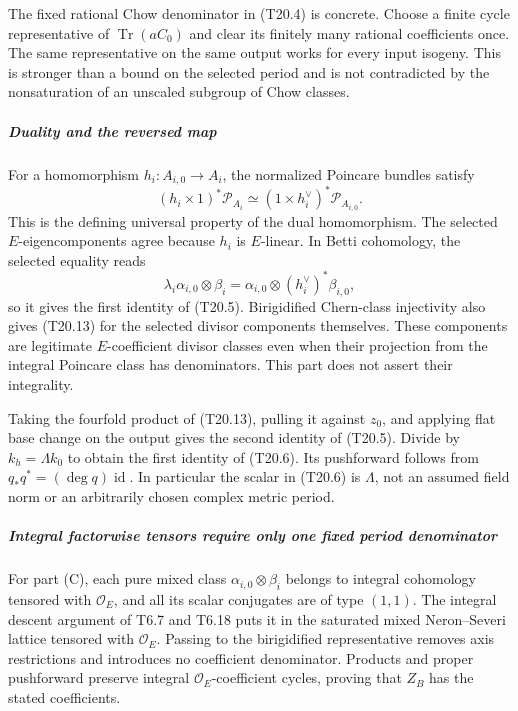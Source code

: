 The fixed rational Chow denominator in (T20.4) is concrete. Choose a finite cycle representative of \(\operatorname{Tr}(a C_0)\) and clear its finitely many rational coefficients once. The same representative on the same output works for every input isogeny. This is stronger than a bound on the selected period and is not contradicted by the nonsaturation of an unscaled subgroup of Chow classes.

\subparagraph{Duality and the reversed map}\label{duality-and-the-reversed-map}

For a homomorphism \(h_i:A_{i,0}\to A_i\), the normalized Poincare bundles satisfy \[
 (h_i\times1)^*\mathcal P_{A_i}
   \simeq (1\times h_i^\vee)^*\mathcal P_{A_{i,0}}.
 \tag{T20.13}
\] This is the defining universal property of the dual homomorphism. The selected \(E\)-eigencomponents agree because \(h_i\) is \(E\)-linear. In Betti cohomology, the selected equality reads \[
 \lambda_i\alpha_{i,0}\otimes\beta_i
   =\alpha_{i,0}\otimes(h_i^\vee)^*\beta_{i,0},
\] so it gives the first identity of (T20.5). Birigidified Chern-class injectivity also gives (T20.13) for the selected divisor components themselves. These components are legitimate \(E\)-coefficient divisor classes even when their projection from the integral Poincare class has denominators. This part does not assert their integrality.

Taking the fourfold product of (T20.13), pulling it against \(z_0\), and applying flat base change on the output gives the second identity of (T20.5). Divide by \(k_h=\Lambda k_0\) to obtain the first identity of (T20.6). Its pushforward follows from \(q_*q^*=(\deg q)\operatorname{id}\). In particular the scalar in (T20.6) is \(\Lambda\), not an assumed field norm or an arbitrarily chosen complex metric period.

\subparagraph{Integral factorwise tensors require only one fixed period denominator}\label{integral-factorwise-tensors-require-only-one-fixed-period-denominator}

For part (C), each pure mixed class \(\alpha_{i,0}\otimes\beta_i\) belongs to integral cohomology tensored with \(\mathcal O_E\), and all its scalar conjugates are of type \((1,1)\). The integral descent argument of T6.7 and T6.18 puts it in the saturated mixed Neron--Severi lattice tensored with \(\mathcal O_E\). Passing to the birigidified representative removes axis restrictions and introduces no coefficient denominator. Products and proper pushforward preserve integral \(\mathcal O_E\)-coefficient cycles, proving that \(Z_B\) has the stated coefficients.

